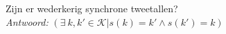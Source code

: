 
\item Zijn er wederkerig synchrone tweetallen? \\


\emph{Antwoord:} $(\exists ~ k, k' \in \mathcal{K} | s(k)=k' \wedge s(k')=k)$ \\

